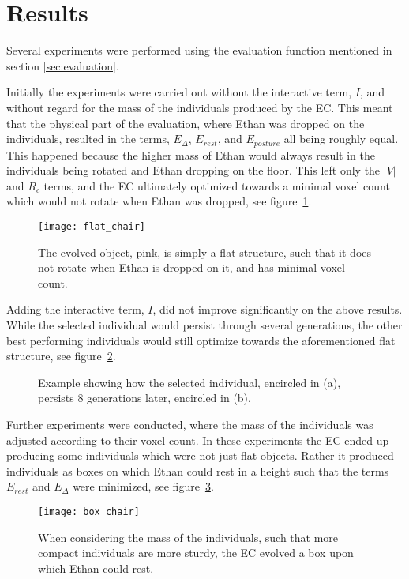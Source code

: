 \section{Results} Several experiments were performed using the evaluation
function mentioned in section \ref{sec:evaluation}. 

Initially the experiments were carried out without the interactive term, $I$,
and without regard for the mass of the individuals produced by the EC. This
meant that the physical part of the evaluation, where Ethan was dropped on the
individuals, resulted in the terms, $E_\Delta$, $E_{rest}$, and $E_{posture}$
all being roughly equal. This happened because the higher mass of Ethan would
always result in the individuals being rotated and Ethan dropping on the floor.
This left only the $|V|$ and $R_c$ terms, and the EC ultimately optimized
towards a minimal voxel count which would not rotate when Ethan was dropped, see
figure~\ref{fig:flat_object}.

\begin{figure}[ht] \centering \texttt{[image: flat\_chair]}
	\caption{The evolved object, pink, is simply a flat structure, such that
	it does not rotate when Ethan is dropped on it, and has minimal voxel
	count.} \label{fig:flat_object} \end{figure}

Adding the interactive term, $I$, did not improve significantly on the above
results. While the selected individual would persist through several
generations, the other best performing individuals would still optimize towards
the aforementioned flat structure, see figure~\ref{fig:selection}.
\begin{figure}[ht] \centering {} \hfil
	\caption{Example showing how the selected individual, encircled in (a),
persists 8 generations later, encircled in (b).} \label{fig:selection}
\end{figure}

Further experiments were conducted, where the mass of the individuals was
adjusted according to their voxel count. In these experiments the EC ended up
producing some individuals which were not just flat objects. Rather it produced
individuals as boxes on which Ethan could rest in a height such that the terms
$E_{rest}$ and $E_\Delta$ were minimized, see figure~\ref{fig:boxchair}.

\begin{figure}[ht] \centering \texttt{[image: box\_chair]}
	\caption{When considering the mass of the individuals, such that more
	compact individuals are more sturdy, the EC evolved a box upon which
	Ethan could rest.} \label{fig:boxchair} \end{figure}
